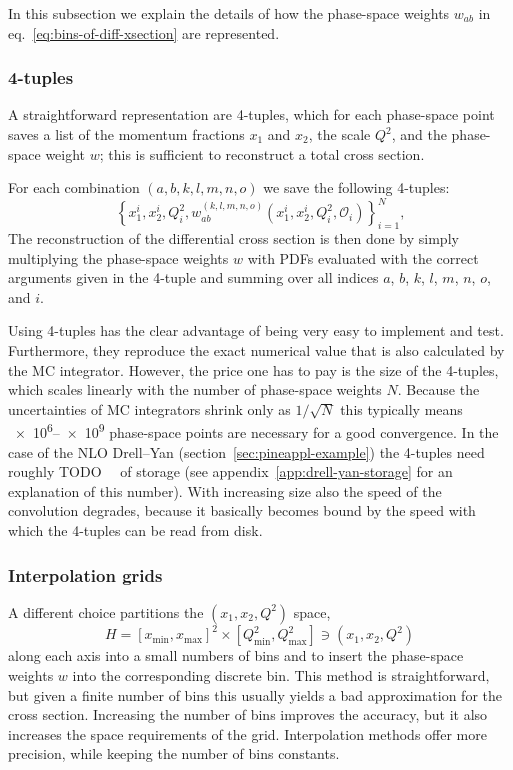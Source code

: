 In this subsection we explain the details of how the phase-space weights $w_{ab}$ in eq.~\eqref{eq:bins-of-diff-xsection} are represented.

\subsubsection{4-tuples}

A straightforward representation are 4-tuples, which for each phase-space point saves a list of the momentum fractions $x_1$ and $x_2$, the scale $Q^2$, and the phase-space weight $w$; this is sufficient to reconstruct a total cross section.

For each combination $(a,b,k,l,m,n,o)$ we save the following 4-tuples:
\begin{equation}
\left\{ x_1^i, x_2^i, Q^2_i, w^{(k,l,m,n,o)}_{ab} (x_1^i, x_2^i, Q^2_i, \mathcal{O}_i) \right\}_{i=1}^N \text{,} \label{eq:four-tuples}
\end{equation}
The reconstruction of the differential cross section is then done by simply multiplying the phase-space weights $w$ with PDFs evaluated with the correct arguments given in the 4-tuple and summing over all indices $a$, $b$, $k$, $l$, $m$, $n$, $o$, and $i$.

Using 4-tuples has the clear advantage of being very easy to implement and test.
Furthermore, they reproduce the exact numerical value that is also calculated by the MC integrator.
However, the price one has to pay is the size of the 4-tuples, which scales linearly with the number of phase-space weights $N$.
Because the uncertainties of MC integrators shrink only as $1/\sqrt{N}$ this typically means \numrange{e6}{e9} phase-space points are necessary for a good convergence.
In the case of the NLO Drell--Yan (section~\ref{sec:pineappl-example}) the 4-tuples need roughly TODO~\si{\giga\byte} of storage (see appendix~\ref{app:drell-yan-storage} for an explanation of this number).
With increasing size also the speed of the convolution degrades, because it basically becomes bound by the speed with which the 4-tuples can be read from disk.

\subsubsection{Interpolation grids}

A different choice partitions the $(x_1, x_2, Q^2)$ space,
\begin{equation}
H = [x_\mathrm{min},x_\mathrm{max}]^2 \times [Q^2_\mathrm{min}, Q^2_\mathrm{max}] \ni (x_1, x_2, Q^2)
\end{equation}
along each axis into a small numbers of bins and to insert the phase-space weights $w$ into the corresponding discrete bin.
This method is straightforward, but given a finite number of bins this usually yields a bad approximation for the cross section.
Increasing the number of bins improves the accuracy, but it also increases the space requirements of the grid.
Interpolation methods offer more precision, while keeping the number of bins constants.


